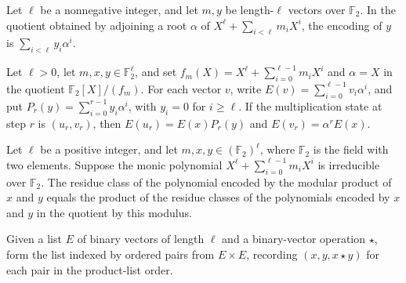 \begin{theorem}
\label{FABL.binaryAdjoinRootEncode_eq_prefix}
\leanok
{}
Let $\ell$ be a nonnegative integer, and let $m,y$ be length-$\ell$ vectors over
$\mathbb F_2$. In the quotient obtained by adjoining a root $\alpha$ of
$X^\ell+\sum_{i<\ell}m_iX^i$, the encoding of $y$ is $\sum_{i<\ell} y_i\alpha^i$.
\end{theorem}

\begin{theorem}
\label{FABL.binaryMulModState_correct}
\leanok
{}
Let $\ell>0$, let $m,x,y\in\mathbb{F}_2^\ell$, and set
$f_m(X)=X^\ell+\sum_{i=0}^{\ell-1}m_iX^i$ and $\alpha=X$ in the quotient
$\mathbb{F}_2[X]/(f_m)$. For each vector $v$, write
$E(v)=\sum_{i=0}^{\ell-1}v_i\alpha^i$, and put $P_r(y)=\sum_{i=0}^{r-1}y_i\alpha^i$,
with $y_i=0$ for $i\ge\ell$. If the multiplication state at step $r$ is $(u_r,v_r)$,
then $E(u_r)=E(x)P_r(y)$ and $E(v_r)=\alpha^rE(x)$.
\end{theorem}

\begin{theorem}
\label{FABL.adjoinRoot_mk_binaryMulMod}
\leanok
{}
Let $\ell$ be a positive integer, and let $m,x,y\in(\mathbb{F}_2)^\ell$, where
$\mathbb{F}_2$ is the field with two elements. Suppose the monic polynomial
$X^\ell+\sum_{i=0}^{\ell-1}m_iX^i$ is irreducible over $\mathbb{F}_2$. The residue class
of the polynomial encoded by the modular product of $x$ and $y$ equals the product of
the residue classes of the polynomials encoded by $x$ and $y$ in the quotient by this
modulus.
\end{theorem}

\begin{definition}
\label{FABL.binaryOperationTable}
\leanok
{}
Given a list $E$ of binary vectors of length $\ell$ and a binary-vector operation
$\star$, form the list indexed by ordered pairs from $E\times E$, recording $(x,y,x\star
y)$ for each pair in the product-list order.
\end{definition}

